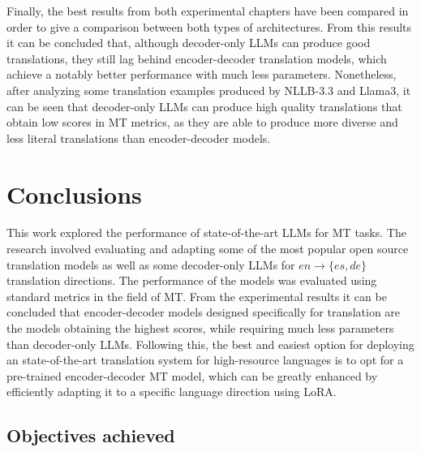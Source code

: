 \documentclass[11pt,english,listoffigures,listoftables]{tfgetsinf}
\begin{document}
Finally, the best results from both experimental chapters have been compared in order to give a comparison between both types of architectures. From this results it can be concluded that, although decoder-only LLMs can produce good translations, they still lag behind encoder-decoder translation models, which achieve a notably better performance with much less parameters. Nonetheless, after analyzing some translation examples produced by NLLB-3.3 and Llama3, it can be seen that decoder-only LLMs can produce high quality translations that obtain low scores in MT metrics, as they are able to produce more diverse and less literal translations than encoder-decoder models.



\chapter{Conclusions}
\label{chapter5}
This work explored the performance of state-of-the-art LLMs for MT tasks. The research involved evaluating and adapting some of the most popular open source translation models as well as some decoder-only LLMs for $en \rightarrow \{es, de\}$ translation directions. The performance of the models was evaluated using standard metrics in the field of MT. From the experimental results it can be concluded that encoder-decoder models designed specifically for translation are the models obtaining the highest scores, while requiring much less parameters than decoder-only LLMs. Following this, the best and easiest option for deploying an state-of-the-art translation system for high-resource languages is to opt for a pre-trained encoder-decoder MT model, which can be greatly enhanced by efficiently adapting it to a specific language direction using LoRA.

\section{Objectives achieved}
\end{document}
